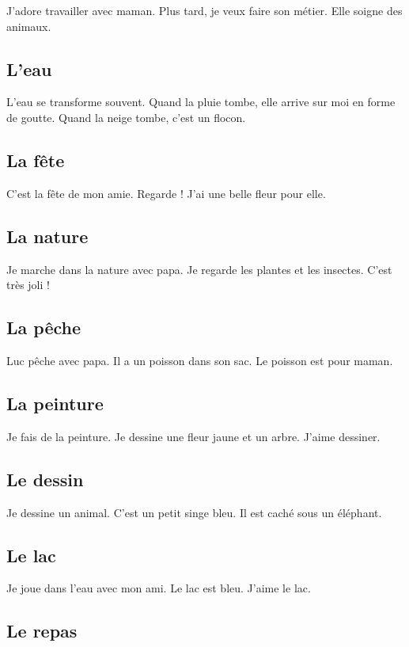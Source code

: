 \documentclass[11pt, french]{article}
\begin{document}
J'adore travailler avec maman. Plus tard, je veux faire son
métier. Elle soigne des animaux.

\subsection{L'eau}

L'eau se transforme souvent. Quand la pluie tombe, elle arrive sur moi
en forme de goutte. Quand la neige tombe, c'est un flocon.

\subsection{La fête}

C'est la fête de mon amie. Regarde ! J'ai une belle fleur pour elle.

\subsection{La nature}

Je marche dans la nature avec papa. Je regarde les plantes et les
insectes. C'est très joli !

\subsection{La pêche}

Luc pêche avec papa. Il a un poisson dans son sac. Le poisson est pour
maman.

\subsection{La peinture}

Je fais de la peinture. Je dessine une fleur jaune et un arbre. J'aime
dessiner.

\subsection{Le dessin}

Je dessine un animal. C'est un petit singe bleu. Il est caché sous un
éléphant.

\subsection{Le lac}

Je joue dans l'eau avec mon ami. Le lac est bleu. J'aime le lac.

\subsection{Le repas}
\end{document}
